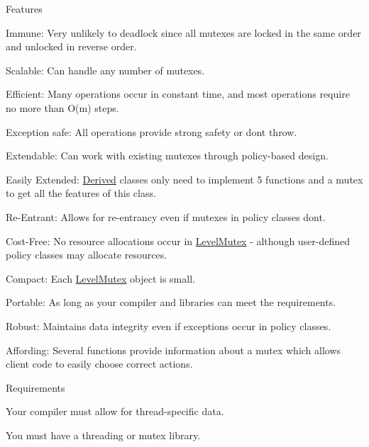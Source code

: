 \begin{DoxyParagraph}{Features}

\begin{DoxyItemize}
\item Immune\+: Very unlikely to deadlock since all mutexes are locked in the same order and unlocked in reverse order.
\item Scalable\+: Can handle any number of mutexes.
\item Efficient\+: Many operations occur in constant time, and most operations require no more than O(m) steps.
\item Exception safe\+: All operations provide strong safety or don\textquotesingle{}t throw.
\item Extendable\+: Can work with existing mutexes through policy-\/based design.
\item Easily Extended\+: \hyperlink{classDerived}{Derived} classes only need to implement 5 functions and a mutex to get all the features of this class.
\item Re-\/\+Entrant\+: Allows for re-\/entrancy even if mutexes in policy classes don\textquotesingle{}t.
\item Cost-\/\+Free\+: No resource allocations occur in \hyperlink{classLoki_1_1LevelMutex}{Level\+Mutex} -\/ although user-\/defined policy classes may allocate resources.
\item Compact\+: Each \hyperlink{classLoki_1_1LevelMutex}{Level\+Mutex} object is small.
\item Portable\+: As long as your compiler and libraries can meet the requirements.
\item Robust\+: Maintains data integrity even if exceptions occur in policy classes.
\item Affording\+: Several functions provide information about a mutex which allows client code to easily choose correct actions.
\end{DoxyItemize}
\end{DoxyParagraph}
\begin{DoxyParagraph}{Requirements}

\begin{DoxyItemize}
\item Your compiler must allow for thread-\/specific data.
\item You must have a threading or mutex library.
\end{DoxyItemize}
\end{DoxyParagraph}
